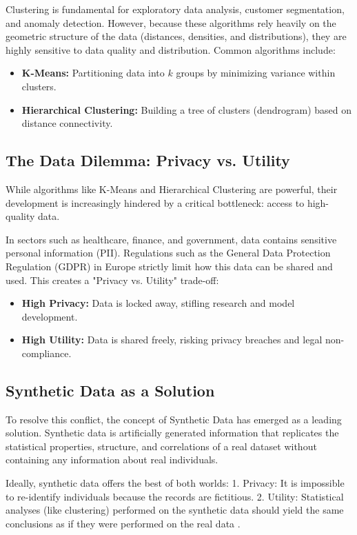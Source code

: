 Clustering is fundamental for exploratory data analysis, customer segmentation, and anomaly detection. However, because these algorithms rely heavily on the geometric structure of the data (distances, densities, and distributions), they are highly sensitive to data quality and distribution. Common algorithms include:
\begin{itemize}
  \item \textbf{K-Means:} Partitioning data into $k$ groups by minimizing variance within clusters.
  \item \textbf{Hierarchical Clustering:} Building a tree of clusters (dendrogram) based on distance connectivity.
\end{itemize}

\subsection{The Data Dilemma: Privacy vs. Utility}
While algorithms like K-Means and Hierarchical Clustering are powerful, their development is increasingly hindered by a critical bottleneck: access to high-quality data.

In sectors such as healthcare, finance, and government, data contains sensitive personal information (PII). Regulations such as the General Data Protection Regulation (GDPR) in Europe strictly limit how this data can be shared and used. This creates a "Privacy vs. Utility" trade-off:
\begin{itemize}
  \item \textbf{High Privacy:} Data is locked away, stifling research and model development.
  \item \textbf{High Utility:} Data is shared freely, risking privacy breaches and legal non-compliance.
\end{itemize}

\subsection{Synthetic Data as a Solution}
To resolve this conflict, the concept of Synthetic Data has emerged as a leading solution. Synthetic data is artificially generated information that replicates the statistical properties, structure, and correlations of a real dataset without containing any information about real individuals.

Ideally, synthetic data offers the best of both worlds: 1. Privacy: It is impossible to re-identify individuals because the records are fictitious. 2. Utility: Statistical analyses (like clustering) performed on the synthetic data should yield the same conclusions as if they were performed on the real data \cite{nowok2016, qian2024}.

